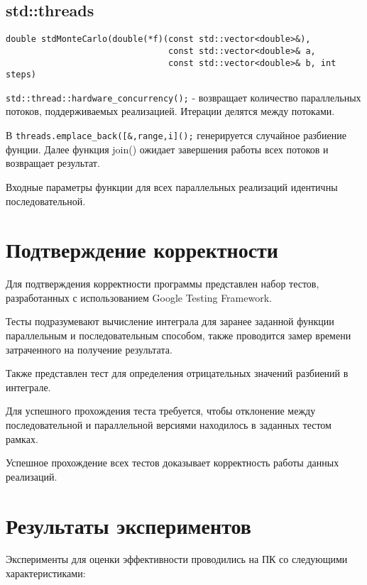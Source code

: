 \documentclass{report}
\begin{document}
\subsection*{std::threads}
\begin{lstlisting}
double stdMonteCarlo(double(*f)(const std::vector<double>&),
                                const std::vector<double>& a,
                                const std::vector<double>& b, int steps)
\end{lstlisting}
\par \verb|std::thread::hardware_concurrency();| - возвращает количество параллельных потоков, поддерживаемых реализацией. Итерации делятся между потоками. 
\par В \verb|threads.emplace_back([&,range,i]();| генерируется случайное разбиение фунции. Далее функция join() ожидает завершения работы всех потоков и возвращает результат.

\par Входные параметры функции для всех параллельных реализаций идентичны последовательной.

\newpage

\section*{Подтверждение корректности}
Для подтверждения корректности программы представлен набор тестов, разработанных с использованием Google Testing Framework.
\par Тесты подразумевают вычисление интеграла для заранее заданной функции параллельным и последовательным способом, также проводится замер времени затраченного на получение результата.
\par Также представлен тест для определения отрицательных значений разбиений в интеграле.
\par Для успешного прохождения теста требуется, чтобы отклонение между последовательной и параллельной версиями находилось в заданных тестом рамках. \par Успешное прохождение всех тестов доказывает корректность работы данных реализаций.
\newpage

\section*{Результаты экспериментов}
Эксперименты для оценки эффективности проводились на ПК со следующими характеристиками:
\end{document}
